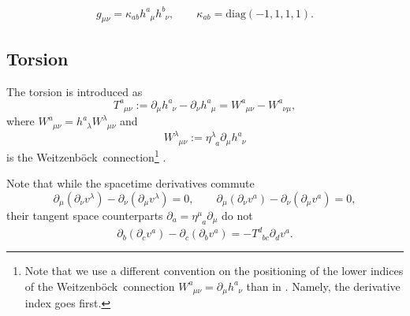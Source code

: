 \documentclass[
10pt, %
a4paper, %
oneside, %
headinclude,footinclude, %
BCOR5mm, %
]{scrartcl}
\newcommand{\pd}[1]{\partial_{#1}}
\newcommand{\mg}[1]{\kappa_{#1}}			%
\newcommand{\tetrsymbol}{h}
\newcommand{\itetrsymbol}{\eta}
\newcommand{\itetr}[2]{\itetrsymbol^{#1}_{\phantom{#1}#2}}
\newcommand{\tetr}[2]{\tetrsymbol^{#1}_{\phantom{#1}#2}}
\newcommand{\rtetr}[2]{h^{#1}_{\mathsmaller{(r)} #2}}
\newcommand{\spin}[2]{\omega^{#1}_{\phantom{#1}#2}}
\newcommand{\D}[1]{\partial_{#1}} %
\newcommand{\Tors}[2]{T^{#1}_{\phantom{a}#2}}
\newcommand{\w}[2]{W^{#1}_{\phantom{#1}#2}}
\newcommand{\We}{Weitzenb\"ock}
\begin{document}
\begin{equation}
	g_{\mu\nu} = \mg{ab} \tetr{a}{\mu}\tetr{b}{\nu}, \qquad \mg{ab} = \text{diag}(-1,1,1,1).
\end{equation}









\subsection{Torsion}

The torsion is introduced as
\begin{equation}\label{eqn.def.tors}
\Tors{a}{\mu\nu}:=\D{\mu}\tetr{a}{\nu} - \D{\nu}\tetr{a}{\mu} = 
\w{a}{\mu\nu} - \w{a}{\nu\mu},
\end{equation}
where $ \w{a}{\mu\nu} = \tetr{a}{\lambda}\w{\lambda}{\mu\nu}$ and 
\begin{equation}
\w{\lambda}{\mu\nu} := 
\itetr{\lambda}{a}\pd{\mu} \tetr{a}{\nu}
\end{equation}
is the \We\ connection\footnote{Note that we use a different convention on the positioning of the 
lower indices of the \We\ connection $ \w{a}{\mu\nu} = \pd{\mu}\tetr{a}{\nu} $ than in 
\cite{AldrovandiPereiraBook}. Namely, the derivative index goes first.}
\cite{AldrovandiPereiraBook,KleinertMultivalued}.


Note that while the spacetime derivatives commute
\begin{equation}\label{eqn.commut.D}
\D{\mu}(\D{\nu} v^\lambda) - \D{\nu}(\D{\mu} v^\lambda) = 0, 
\qquad 
\D{\mu}(\D{\nu} v^a) - \D{\nu}(\D{\mu} v^a) = 0,
\end{equation}
their tangent space counterparts $\D{a} = \itetr{\mu}{a}\D{\mu}$ do not
\begin{equation}
\D{b}(\D{c} v^a) - \D{c}(\D{b} v^a) = 
-\Tors{d}{b c}\D{d}v^a .
\end{equation}

%
\end{document}

